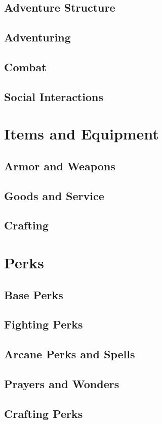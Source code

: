 \documentclass{book}
\begin{document}
\chapter{Adventure Structure}
\chapter{Adventuring}
\chapter{Combat}
\chapter{Social Interactions}

\part{Items and Equipment}
\chapter{Armor and Weapons}
\chapter{Goods and Service}
\chapter{Crafting}

\part{Perks}
\chapter{Base Perks}
\chapter{Fighting Perks}
\chapter{Arcane Perks and Spells}
\chapter{Prayers and Wonders}
\chapter{Crafting Perks}
\end{document}
